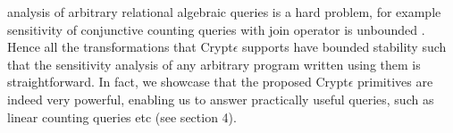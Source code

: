 analysis of arbitrary relational algebraic queries is a hard problem, for example sensitivity of conjunctive counting queries with join operator is unbounded \cite{sensitivity}. Hence all the transformations that Crypt$\epsilon$ supports have bounded stability \cite{PINQ} such that the sensitivity analysis of any arbitrary program written using them is straightforward. In fact, we showcase that the proposed Crypt$\epsilon$ primitives are indeed very powerful, enabling us to answer practically useful queries, such as linear counting queries etc (see section 4). 








